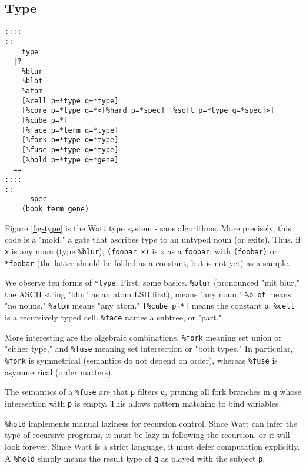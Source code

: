 \documentclass[10pt, nocopyrightspace]{sigplanconf}
\begin{document}
\subsection{Type}

\begin{figure*}[ht]
\begin{center}
\makebox[\textwidth]{\hrulefill}
\begin{verbatim}
::::
::
    type
  |?
    %blur
    %blot
    %atom
    [%cell p=*type q=*type]
    [%core p=*type q=*<[%hard p=*spec] [%soft p=*type q=*spec]>]
    [%cube p=*]
    [%face p=*term q=*type]
    [%fork p=*type q=*type]
    [%fuse p=*type q=*type]
    [%hold p=*type q=*gene]
  ==
::::
::  
      spec  
    (book term gene)
\end{verbatim}
\end{center}
\caption{type.plow}
\label{fig-type}
\end{figure*}

Figure \ref{fig-type} is the Watt type system - sans algorithms.
More precisely, this code is a "mold," a gate that ascribes type
to an untyped noun (or exits).  Thus, if \verb|x| is any noun
(type \verb|%blur|), \verb|(foobar x)| is x as a \verb|foobar|,
with \verb|(foobar)| or \verb|*foobar| (the latter should be
folded as a constant, but is not yet) as a sample.

We observe ten forms of \verb|*type|.  First, some basics.
\verb|%blur| (pronounced "mit blur," the ASCII string "blur" as
an atom LSB first), means "any noun." \verb|%blot| means "no
nouns."  \verb|%atom| means "any atom." \verb|[%cube p=*]| means
the constant \verb|p|. \verb|%cell| is a recursively typed cell.
\verb|%face| names a subtree, or "part."  

More interesting are the algebraic combinations, 
\verb|%fork| meaning set union or "either type," 
and \verb|%fuse| meaning set intersection or "both types."  In
particular, \verb|%fork| is symmetrical (semantics do not depend on
order), whereas \verb|%fuse| is asymmetrical (order matters).

The semantics of a \verb|%fuse| are that \verb|p| filters
\verb|q|, pruning all fork branches in \verb|q| whose
intersection with \verb|p| is empty.  This allows pattern
matching to bind variables.

\verb|%hold| implements manual laziness for
recursion control.  Since Watt can infer the type of recursive
programs, it must be lazy in following the recursion, or it will
look forever.  Since Watt is a strict language, it must defer
computation explicitly.  A \verb|%hold| simply means the result type
of \verb|q| as played with the subject \verb|p|.
\end{document}
